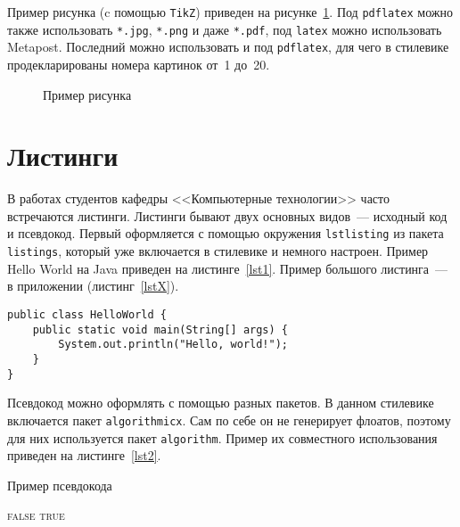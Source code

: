 \documentclass[times,specification,annotation]{itmo-student-thesis}
\begin{document}
Пример рисунка (c помощью \texttt{TikZ}) приведен на рисунке~\ref{fig1}. Под \texttt{pdflatex} можно также
использовать \texttt{*.jpg}, \texttt{*.png} и даже \texttt{*.pdf}, под \texttt{latex} можно использовать
Metapost. Последний можно использовать и под \texttt{pdflatex}, для чего в стилевике продекларированы
номера картинок от~1 до~20.

\begin{figure}[!h]
\caption{Пример рисунка}\label{fig1}
\centering
{}
\end{figure}

\section{Листинги}

В работах студентов кафедры <<Компьютерные технологии>> часто встречаются листинги. Листинги бывают
двух основных видов~--- исходный код и псевдокод. Первый оформляется с помощью окружения \texttt{lstlisting}
из пакета \texttt{listings}, который уже включается в стилевике и немного настроен. Пример Hello World на Java
приведен на листинге~\ref{lst1}. Пример большого листинга~--- в приложении (листинг~\ref{lstX}).

\begin{lstlisting}[float=!h,caption={Пример исходного кода на Java},label={lst1}]
public class HelloWorld {
    public static void main(String[] args) {
        System.out.println("Hello, world!");
    }
}
\end{lstlisting}

Псевдокод можно оформлять с помощью разных пакетов. В данном стилевике включается пакет \texttt{algorithmicx}.
Сам по себе он не генерирует флоатов, поэтому для них используется пакет \texttt{algorithm}.
Пример их совместного использования приведен на листинге~\ref{lst2}.

\begin{algorithm}[!h]
\caption{Пример псевдокода}\label{lst2}
\begin{algorithmic}
				\State\Return \textsc{false}
			\EndIf
		\EndFor
		\State\Return \textsc{true}
	\EndFunction
\end{algorithmic}
\end{algorithm}
\end{document}
